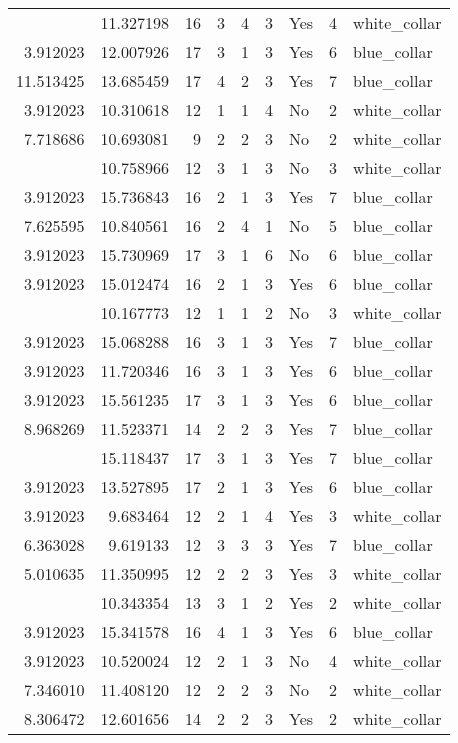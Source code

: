 \documentclass[
]{article}
\begin{document}
\begin{longtable}[t]{rrrrrllrl}
\addlinespace
8.174703 & 11.327198 & 16 & 3 & 4 & 3 & Yes & 4 & white\_collar\\
3.912023 & 12.007926 & 17 & 3 & 1 & 3 & Yes & 6 & blue\_collar\\
11.513425 & 13.685459 & 17 & 4 & 2 & 3 & Yes & 7 & blue\_collar\\
3.912023 & 10.310618 & 12 & 1 & 1 & 4 & No & 2 & white\_collar\\
7.718686 & 10.693081 & 9 & 2 & 2 & 3 & No & 2 & white\_collar\\
\addlinespace
3.912023 & 10.758966 & 12 & 3 & 1 & 3 & No & 3 & white\_collar\\
3.912023 & 15.736843 & 16 & 2 & 1 & 3 & Yes & 7 & blue\_collar\\
7.625595 & 10.840561 & 16 & 2 & 4 & 1 & No & 5 & blue\_collar\\
3.912023 & 15.730969 & 17 & 3 & 1 & 6 & No & 6 & blue\_collar\\
3.912023 & 15.012474 & 16 & 2 & 1 & 3 & Yes & 6 & blue\_collar\\
\addlinespace
3.912023 & 10.167773 & 12 & 1 & 1 & 2 & No & 3 & white\_collar\\
3.912023 & 15.068288 & 16 & 3 & 1 & 3 & Yes & 7 & blue\_collar\\
3.912023 & 11.720346 & 16 & 3 & 1 & 3 & Yes & 6 & blue\_collar\\
3.912023 & 15.561235 & 17 & 3 & 1 & 3 & Yes & 6 & blue\_collar\\
8.968269 & 11.523371 & 14 & 2 & 2 & 3 & Yes & 7 & blue\_collar\\
\addlinespace
3.912023 & 15.118437 & 17 & 3 & 1 & 3 & Yes & 7 & blue\_collar\\
3.912023 & 13.527895 & 17 & 2 & 1 & 3 & Yes & 6 & blue\_collar\\
3.912023 & 9.683464 & 12 & 2 & 1 & 4 & Yes & 3 & white\_collar\\
6.363028 & 9.619133 & 12 & 3 & 3 & 3 & Yes & 7 & blue\_collar\\
5.010635 & 11.350995 & 12 & 2 & 2 & 3 & Yes & 3 & white\_collar\\
\addlinespace
3.912023 & 10.343354 & 13 & 3 & 1 & 2 & Yes & 2 & white\_collar\\
3.912023 & 15.341578 & 16 & 4 & 1 & 3 & Yes & 6 & blue\_collar\\
3.912023 & 10.520024 & 12 & 2 & 1 & 3 & No & 4 & white\_collar\\
7.346010 & 11.408120 & 12 & 2 & 2 & 3 & No & 2 & white\_collar\\
8.306472 & 12.601656 & 14 & 2 & 2 & 3 & Yes & 2 & white\_collar\\

\end{longtable}
\end{document}
